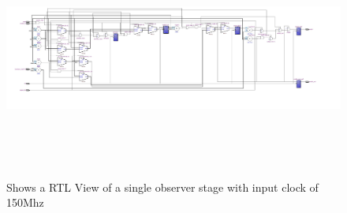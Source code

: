 \begin{figure}[]
\centering
\includegraphics[width=650px,height=300px,angle=-90]{../../pictures/22.02.2014/onlyObserver/OBS_150M.jpg}
\caption[RTL View of Observer 0 with clock 150Mhz]{Shows a RTL View of a single observer stage with input clock of 150Mhz}
\label{fig:test:only:150:obs0}
\end{figure}

\newpage
